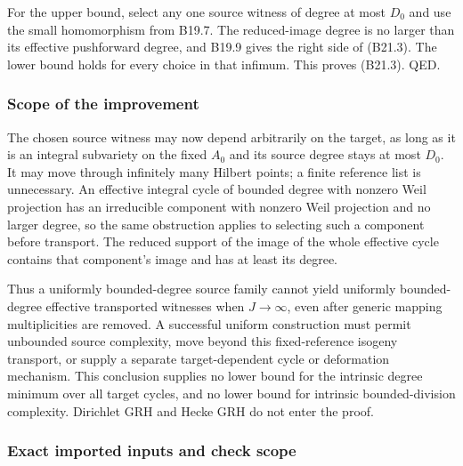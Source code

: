 For the upper bound, select any one source witness of degree at most \(D_0\) and use the small homomorphism from B19.7. The reduced-image degree is no larger than its effective pushforward degree, and B19.9 gives the right side of (B21.3). The lower bound holds for every choice in that infimum. This proves (B21.3). QED.

\subsubsection{Scope of the improvement}\label{scope-of-the-improvement}

The chosen source witness may now depend arbitrarily on the target, as long as it is an integral subvariety on the fixed \(A_0\) and its source degree stays at most \(D_0\). It may move through infinitely many Hilbert points; a finite reference list is unnecessary. An effective integral cycle of bounded degree with nonzero Weil projection has an irreducible component with nonzero Weil projection and no larger degree, so the same obstruction applies to selecting such a component before transport. The reduced support of the image of the whole effective cycle contains that component's image and has at least its degree.

Thus a uniformly bounded-degree source family cannot yield uniformly bounded-degree effective transported witnesses when \(J\to\infty\), even after generic mapping multiplicities are removed. A successful uniform construction must permit unbounded source complexity, move beyond this fixed-reference isogeny transport, or supply a separate target-dependent cycle or deformation mechanism. This conclusion supplies no lower bound for the intrinsic degree minimum over all target cycles, and no lower bound for intrinsic bounded-division complexity. Dirichlet GRH and Hecke GRH do not enter the proof.

\subsubsection{Exact imported inputs and check scope}\label{exact-imported-inputs-and-check-scope}

